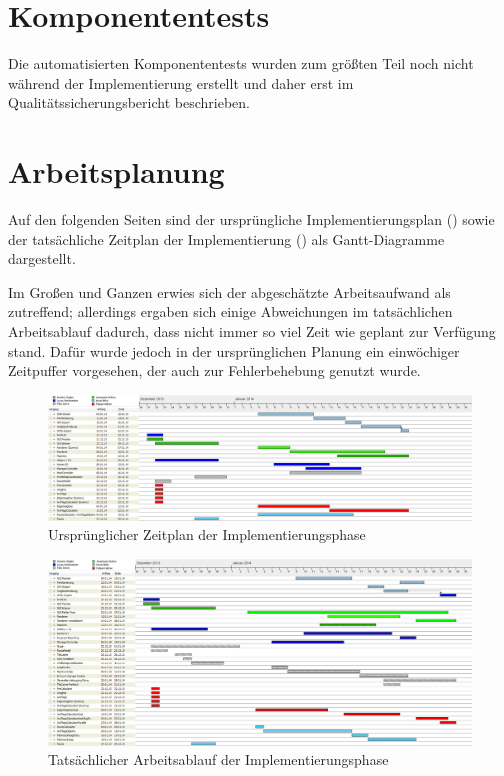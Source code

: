 \documentclass[a4paper, 11pt]{article}
\begin{document}
\section{Komponententests}
Die automatisierten Komponententests wurden zum größten Teil noch nicht während der Implementierung erstellt und daher erst im Qualitätssicherungsbericht beschrieben.

\section{Arbeitsplanung}
Auf den folgenden Seiten sind der ursprüngliche Implementierungsplan () sowie der tatsächliche Zeitplan der Implementierung () als Gantt-Diagramme dargestellt.

Im Großen und Ganzen erwies sich der abgeschätzte Arbeitsaufwand als zutreffend; allerdings ergaben sich einige Abweichungen im tatsächlichen Arbeitsablauf dadurch, dass nicht immer so viel Zeit wie geplant zur Verfügung stand. Dafür wurde jedoch in der ursprünglichen Planung ein einwöchiger Zeitpuffer vorgesehen, der auch zur Fehlerbehebung genutzt wurde.

\begin{figure}[h]
\centering
\vspace{-2.5cm}\includegraphics[angle=90,scale=0.4]{zeitplan}
\caption{Ursprünglicher Zeitplan der Implementierungsphase}
\label{fig:zeitplan}
\end{figure}
\begin{figure}[h]
\centering
\vspace{-2.25cm}\includegraphics[angle=90,scale=0.4]{zeitplan_final}
\caption{Tatsächlicher Arbeitsablauf der Implementierungsphase}
\label{fig:zeitplan_final}
\end{figure}

\makeatletter
{}
\makeatother
\printglossary[type=main, title={Glossar}, toctitle={Glossar}, style=myAltlist]
\end{document}
